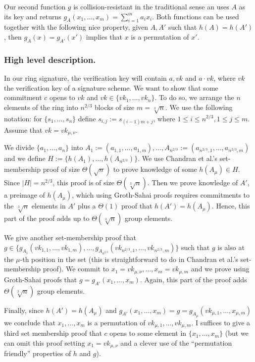 Our second function $g$ is collision-resistant in the traditional sense an uses $A$ as its key and returns $g_A(x_1,\ldots,x_m) = \sum_{i=1}^m a_ix_i$. Both functions can be used together with the following nice property, given $A,A'$ such that $h(A)=h(A')$, then $g_A(x)=g_{A'}(x')$ implies that $x$ is a permutation of $x'$.

\subsubsection{High level description.}
In our ring signature, the verification key will contain $a,vk$ and $a\cdot vk$, where $vk$ the verification key of a signature scheme. We want to show that some commitment $c$ opens to $vk$ and $vk\in\{vk_1,\ldots,vk_n\}$. To do so, we arrange the $n$ elements of the ring into $n^{2/3}$ blocks of size $m=\sqrt[3]{n}$. We use the following notation: for $\{s_1,\ldots, s_n\}$ define $s_{i,j}:=s_{(i-1)m+j}$, where  $1\leq i \leq n^{2/3},1\leq  j \leq m$. Assume that $vk = vk_{\mu,\nu}$.

We divide $\{a_{1},\ldots, a_{n}\}$ into $A_1 := (a_{1,1},\ldots,a_{1,m}),\ldots, A_{n^{2/3}} := (a_{n^{2/3},1},\ldots,\allowbreak a_{n^{2/3},m})$ and we define $H\allowbreak:=\{h(A_1),\allowbreak\ldots,\allowbreak h(A_{n^{2/3}})\}.$  
We use Chandran et al.'s set-membership proof of size $\Theta(\sqrt{n})$ to prove knowledge of some $h(A_\mu)\in H$. Since $|H|=n^{2/3}$, this proof is of size $\Theta(\sqrt[3]{n})$. Then we prove knowledge of $A'$, a preimage of $h(A_\mu)$, which using Groth-Sahai proofs requires commitments to the $\sqrt[3]{n}$ elements in $A'$ plus a $\Theta(1)$ proof that $h(A')=h(A_\mu)$. Hence, this part of the proof adds up to $\Theta(\sqrt[3]{n})$ group elements.

We give another set-membership proof that
$g\in\{
g_{A_1}(vk_{1,1},\ldots,vk_{1,m}),
\ldots,\allowbreak
g_{A_{n^{2/3}}}(
	vk_{n^{2/3},1},
	\ldots,
	vk_{n^{2/3},m})\}$ such that $g$ is also at the $\mu$-th position in the set (this is straightforward to do in Chandran et al.'s set-membership proof).
We commit to $x_1=vk_{\mu,\nu},\ldots,x_m=vk_{\mu,m}$ and we prove using Groth-Sahai proofs that $g = g_{A'}(x_1,\ldots,x_m)$. Again, this part of the proof adds $\Theta(\sqrt[3]{n})$ group elements.

Finally, since $h(A')=h(A_\mu)$ and $g_{A'}(x_1,\ldots,x_m) = g = g_{A_{\mu}}(vk_{\mu,1},\ldots,x_{\mu,m})$ we conclude that $x_1,\ldots,x_m$ is a permutation of $vk_{\mu,1},\ldots,vk_{\mu,m}$. I suffices to give a third set membership proof that $c$ opens to some element in $\{x_1,\ldots,x_m\}$ (but we can omit this proof setting $x_1 =vk_{\mu,\nu}$ and a clever use of the ``permutation friendly'' properties of $h$ and $g$).